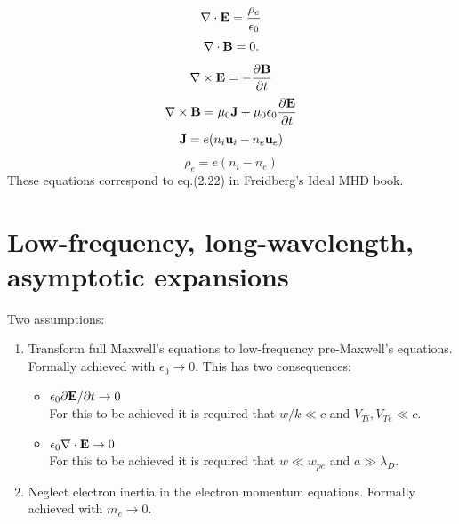 \documentclass[oneside,a4paper,11pt]{report}
\begin{document}
\begin{equation}
\label{eq:twof_maxwell_3}
\nabla \cdot \mathbf{E} = \frac{\rho_e}{\epsilon_0} 
\end{equation}
\begin{equation}
\label{eq:twof_maxwell_4}
\nabla \cdot \mathbf{B} = 0.
\end{equation}
\begin{equation}
\label{eq:twof_maxwell_1}
\nabla \times \mathbf{E} = -\frac{ \partial \mathbf{B}}{\partial t}
\end{equation}
\begin{equation}
\label{eq:twof_maxwell_2}
\nabla \times \mathbf{B} = \mu_0 \mathbf{J} + \mu_0 \epsilon_0 \frac{\partial \mathbf{E}}{\partial t}
\end{equation}
\begin{equation}
\label{eq:twof_curr_density}
    \mathbf{J} = e (n_i \mathbf{u}_i - n_e \mathbf{u}_e)
\end{equation}
\begin{equation}
\label{eq:twof_mass_density}
    \rho_e = e (n_i - n_e) 
\end{equation}
These equations correspond to eq.\@ (2.22) in Freidberg's Ideal MHD book.

\section{Low-frequency, long-wavelength, asymptotic expansions}
Two assumptions:
\begin{enumerate}
\item Transform full Maxwell's equations to low-frequency pre-Maxwell's equations. Formally achieved with $\epsilon_0 \to 0$. This has two consequences:
\begin{itemize}
\item $\epsilon_0 \partial \mathbf{E} / \partial t \to 0$ \\
For this to be achieved it is required that $w/k \ll c$ and $V_{Ti}, V_{Te} \ll c$.
\item $\epsilon_0 \nabla \cdot \mathbf{E} \to 0$\\
For this to be achieved it is required that $w \ll w_{pe}$ and $a \gg \lambda_{D}$.
\end{itemize}
\item Neglect electron inertia in the electron momentum equations. Formally achieved with $m_e \to 0$.
\end{enumerate}
\end{document}
